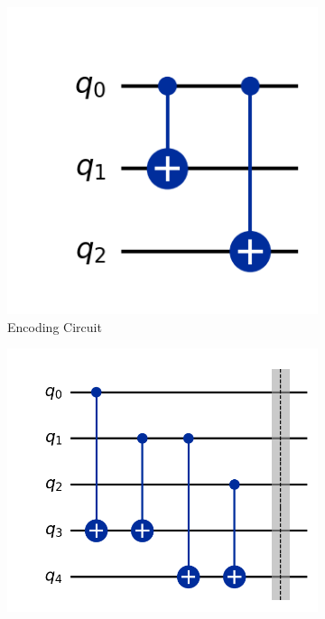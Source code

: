 \documentclass[conference]{IEEEtran}
\begin{document}
\begin{figure}[h!]
    \centering

    \begin{subfigure}[b]{0.3\columnwidth}
        \centering
        \includegraphics[width=\textwidth]{../Codes/results/3bitPhaseEC/EncodingCircuit.png}
        \caption{Encoding Circuit}
        \label{fig:3bitPhaseECCircuit}
    \end{subfigure}
    \hfill
    \begin{subfigure}[b]{0.3\columnwidth}
        \centering
        \includegraphics[width=\textwidth]{../Codes/results/3bitPhaseEC/SyndromeMeasurementCircuit.png}

\end{subfigure}
\end{figure}
\end{document}
